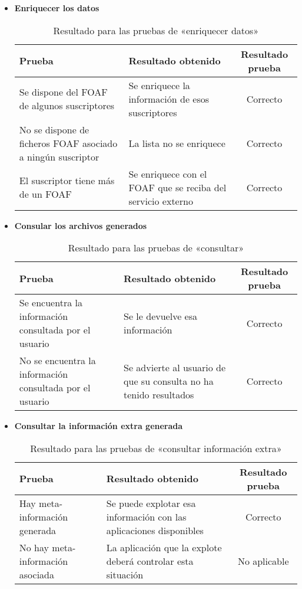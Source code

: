 \begin{itemize}
  \item \textbf{Enriquecer los datos}
	\begin{table}[H]
	 \begin{center}
	  \begin{tabular}{|p{4cm}|p{6cm}|c|}
		\hline
		\textbf{Prueba} & \textbf{Resultado obtenido} & \textbf{Resultado prueba} \\ 
		\hline
		Se dispone del FOAF de algunos suscriptores
		& 
		Se enriquece la información de esos suscriptores
		&
		Correcto
		\\\hline
		No se dispone de ficheros FOAF asociado a ningún suscriptor
		& 
		La lista no se enriquece
		&
		Correcto
		\\\hline
		El suscriptor tiene más de un FOAF
		& 
		Se enriquece con el FOAF que se reciba del servicio externo
		&
		Correcto
		\\\hline
	  \end{tabular}
	  \caption{Resultado para las pruebas de «enriquecer datos»}
	 \end{center}
	\end{table}

  \item \textbf{Consular los archivos generados}
	\begin{table}[H]
	 \begin{center}
	  \begin{tabular}{|p{4cm}|p{6cm}|c|}
		\hline
		\textbf{Prueba} & \textbf{Resultado obtenido} & \textbf{Resultado prueba} \\ 
		\hline
		Se encuentra la información consultada por el usuario
		& 
		Se le devuelve esa información
		&
		Correcto
		\\\hline
		No se encuentra la información consultada por el usuario
		& 
		Se advierte al usuario de que su consulta no ha tenido resultados
		&
		Correcto
		\\\hline
	  \end{tabular}
	  \caption{Resultado para las pruebas de «consultar»}
	 \end{center}
	\end{table}

  \item \textbf{Consultar la información extra generada}
	\begin{table}[H]
	 \begin{center}
	  \begin{tabular}{|p{4cm}|p{6cm}|c|}
		\hline
		\textbf{Prueba} & \textbf{Resultado obtenido} & \textbf{Resultado prueba} \\ 
		\hline
		Hay meta-información generada
		& 
		Se puede explotar esa información con las aplicaciones disponibles
		&
		Correcto
		\\\hline
		No hay meta-información asociada
		& 
		La aplicación que la explote deberá controlar esta situación
		&
		No aplicable
		\\\hline
	  \end{tabular}
	  \caption{Resultado para las pruebas de «consultar información extra»}
	 \end{center}
	\end{table}

\end{itemize}


